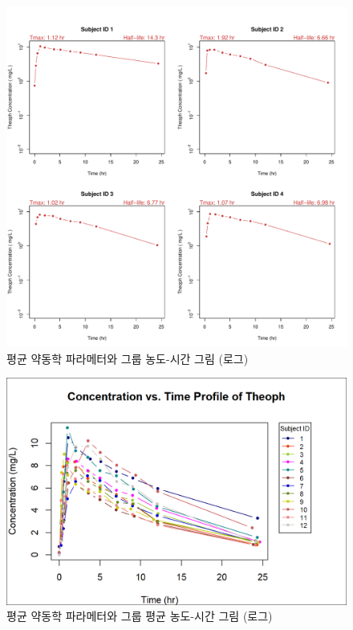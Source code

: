 \documentclass[
  12pt,
]{krantz}
\begin{document}
\begin{figure}
\includegraphics[width=1\linewidth]{Output/Individual PK Log 10 Scale for Theoph} \caption{평균 약동학 파라메터와 그룹 농도-시간 그림 (로그)}\label{fig:unnamed-chunk-6}
\end{figure}

\begin{figure}
\includegraphics[width=1\linewidth]{Output/PK Profile Linear Scale for Theoph} \caption{평균 약동학 파라메터와 그룹 평균 농도-시간 그림 (로그)}\label{fig:unnamed-chunk-7}
\end{figure}
\end{document}
